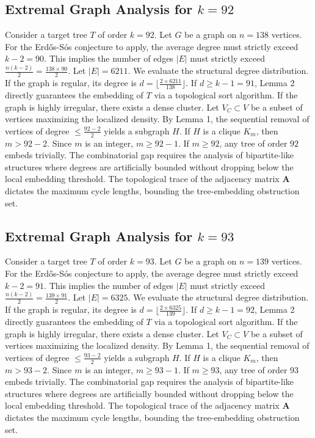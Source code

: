 \documentclass[11pt,a4paper]{article}
\begin{document}
\subsection{Extremal Graph Analysis for $k=92$}
Consider a target tree $T$ of order $k=92$.
Let $G$ be a graph on $n=138$ vertices.
For the Erd\H{o}s-S\'os conjecture to apply, the average degree must strictly exceed $k-2 = 90$.
This implies the number of edges $|E|$ must strictly exceed $\frac{n(k-2)}{2} = \frac{138 \times 90}{2}$.
Let $|E| = 6211$.
We evaluate the structural degree distribution. If the graph is regular, its degree is $d = \lfloor \frac{2 \times 6211}{138} \rfloor$.
If $d \geq k-1 = 91$, Lemma 2 directly guarantees the embedding of $T$ via a topological sort algorithm.
If the graph is highly irregular, there exists a dense cluster. Let $V_C \subset V$ be a subset of vertices maximizing the localized density.
By Lemma 1, the sequential removal of vertices of degree $\leq \frac{92-2}{2}$ yields a subgraph $H$.
If $H$ is a clique $K_{m}$, then $m > 92-2$. Since $m$ is an integer, $m \geq 92-1$. If $m \geq 92$, any tree of order $92$ embeds trivially.
The combinatorial gap requires the analysis of bipartite-like structures where degrees are artificially bounded without dropping below the local embedding threshold. The topological trace of the adjacency matrix $\mathbf{A}$ dictates the maximum cycle lengths, bounding the tree-embedding obstruction set.


\subsection{Extremal Graph Analysis for $k=93$}
Consider a target tree $T$ of order $k=93$.
Let $G$ be a graph on $n=139$ vertices.
For the Erd\H{o}s-S\'os conjecture to apply, the average degree must strictly exceed $k-2 = 91$.
This implies the number of edges $|E|$ must strictly exceed $\frac{n(k-2)}{2} = \frac{139 \times 91}{2}$.
Let $|E| = 6325$.
We evaluate the structural degree distribution. If the graph is regular, its degree is $d = \lfloor \frac{2 \times 6325}{139} \rfloor$.
If $d \geq k-1 = 92$, Lemma 2 directly guarantees the embedding of $T$ via a topological sort algorithm.
If the graph is highly irregular, there exists a dense cluster. Let $V_C \subset V$ be a subset of vertices maximizing the localized density.
By Lemma 1, the sequential removal of vertices of degree $\leq \frac{93-2}{2}$ yields a subgraph $H$.
If $H$ is a clique $K_{m}$, then $m > 93-2$. Since $m$ is an integer, $m \geq 93-1$. If $m \geq 93$, any tree of order $93$ embeds trivially.
The combinatorial gap requires the analysis of bipartite-like structures where degrees are artificially bounded without dropping below the local embedding threshold. The topological trace of the adjacency matrix $\mathbf{A}$ dictates the maximum cycle lengths, bounding the tree-embedding obstruction set.
\end{document}
